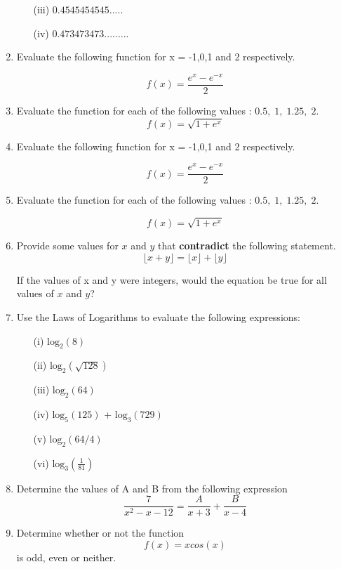 \documentclass[a4paper,12pt]{article}
\begin{document}
\begin{enumerate}
\begin{multicols}{2}
\begin{itemize}
		\item[(iii)] $0.4545454545.....$
		\item[(iv)] $0.473473473.........$
	\end{itemize} 
\end{multicols}


		\item Evaluate the following function for x = -1,0,1 and 2 respectively.
		{

			\[ f(x) = \frac{e^x - {e^{-x}}}{2} \]
		}
		\item Evaluate the function for each of the following values : $0.5,\;1,\;1.25,\;2$.
		{
			\Large
			\[f(x) =  \sqrt{1+e^{x}}  \]
		}

\item  Evaluate the following function for x = -1,0,1 and 2 respectively.
		{

			\[ f(x) = \frac{e^x - {e^{-x}}}{2} \]
		}
		\item Evaluate the function for each of the following values : $0.5,\;1,\;1.25,\;2$.
		{

			\[f(x) =  \sqrt{1+e^{x}}  \]
		}

\item Provide some values for $x$ and $y$ that \textbf{contradict} the following statement.
	\[ \lfloor x + y \rfloor  = \lfloor x\rfloor + \lfloor y \rfloor\]
	
	\noindent If the values of x and y were integers, would the equation be true for all values of $x$ and $y$?


\item  Use the Laws of Logarithms to evaluate the following expressions:

	\begin{multicols}{2}
		\begin{itemize}
		\item[(i)] $\mbox{log}_2(8)$
		\item[(ii)] $\mbox{log}_2(\sqrt{128})$
		\item[(iii)] $\mbox{log}_2(64)$
		\item[(iv)] $\mbox{log}_5(125)$ +   $\mbox{log}_3(729)$
		\item[(v)] $\mbox{log}_2(64/4)$
		\item[(vi)] $\mbox{log}_3(\frac{1}{81})$
				\end{itemize}
		\end{multicols}


	\item Determine the values of A and B from the following expression
	\[  \frac{7}{x^2-x-12} = \frac{A}{x+3} + \frac{B}{x-4}\]
	\item  Determine whether or not the function \[f(x) = x cos(x)\] is odd, even or neither.


\end{enumerate}
\end{document}
